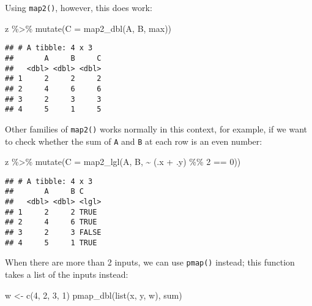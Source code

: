 \documentclass[
]{book}
\newenvironment{Shaded}{\begin{snugshade}}{\end{snugshade}}
\newcommand{\AttributeTok}[1]{\textcolor[rgb]{0.77,0.63,0.00}{#1}}
\newcommand{\DecValTok}[1]{\textcolor[rgb]{0.00,0.00,0.81}{#1}}
\newcommand{\FunctionTok}[1]{\textcolor[rgb]{0.00,0.00,0.00}{#1}}
\newcommand{\NormalTok}[1]{#1}
\newcommand{\OtherTok}[1]{\textcolor[rgb]{0.56,0.35,0.01}{#1}}
\newcommand{\SpecialCharTok}[1]{\textcolor[rgb]{0.00,0.00,0.00}{#1}}
\begin{document}
Using \texttt{map2()}, however, this does work:

\begin{Shaded}
\begin{Highlighting}[]
\NormalTok{z }\SpecialCharTok{\%\textgreater{}\%} \FunctionTok{mutate}\NormalTok{(}\AttributeTok{C =} \FunctionTok{map2\_dbl}\NormalTok{(A, B, max))}
\end{Highlighting}
\end{Shaded}

\begin{verbatim}
## # A tibble: 4 x 3
##       A     B     C
##   <dbl> <dbl> <dbl>
## 1     2     2     2
## 2     4     6     6
## 3     2     3     3
## 4     5     1     5
\end{verbatim}

Other families of \texttt{map2()} works normally in this context, for example, if we want to check whether the sum of \texttt{A} and \texttt{B} at each row is an even number:

\begin{Shaded}
\begin{Highlighting}[]
\NormalTok{z }\SpecialCharTok{\%\textgreater{}\%} \FunctionTok{mutate}\NormalTok{(}\AttributeTok{C =} \FunctionTok{map2\_lgl}\NormalTok{(A, B, }\SpecialCharTok{\textasciitilde{}}\NormalTok{ (.x }\SpecialCharTok{+}\NormalTok{ .y) }\SpecialCharTok{\%\%} \DecValTok{2} \SpecialCharTok{==} \DecValTok{0}\NormalTok{))}
\end{Highlighting}
\end{Shaded}

\begin{verbatim}
## # A tibble: 4 x 3
##       A     B C    
##   <dbl> <dbl> <lgl>
## 1     2     2 TRUE 
## 2     4     6 TRUE 
## 3     2     3 FALSE
## 4     5     1 TRUE
\end{verbatim}

When there are more than 2 inputs, we can use \texttt{pmap()} instead; this function takes a list of the inputs instead:

\begin{Shaded}
\begin{Highlighting}[]
\NormalTok{w }\OtherTok{\textless{}{-}} \FunctionTok{c}\NormalTok{(}\DecValTok{4}\NormalTok{, }\DecValTok{2}\NormalTok{, }\DecValTok{3}\NormalTok{, }\DecValTok{1}\NormalTok{)}
\FunctionTok{pmap\_dbl}\NormalTok{(}\FunctionTok{list}\NormalTok{(x, y, w), sum)}
\end{Highlighting}
\end{Shaded}
\end{document}
